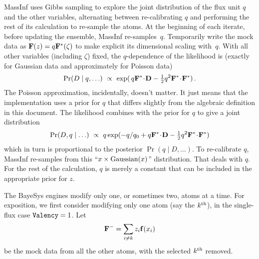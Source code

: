 MassInf uses Gibbs sampling to explore the joint distribution of the flux unit $q$ and the other variables, 
alternating between re-calibrating $q$ and performing the rest of its calculation to re-sample the atoms.
At the beginning of each iterate, before updating the ensemble, MassInf re-samples~$q$.
Temporarily write the mock data as ${\bf F}(z) = q{\bf F}^*(\zeta)$ to make explicit its dimensional scaling with~$q$.
With all other variables (including $\zeta$) fixed, the $q$-dependence of the likelihood is (exactly for Gaussian data and approximately for Poisson data)
$$
    \Pr(D\mid q,\ldots)\ \propto\ \exp(\,q {\bf F}^*\!\cdot\! {\bf D} - \hbox{$1 \over 2$} q^2 {\bf F}^*\!\cdot\! {\bf F}^*)\,.
$$
The Poisson approximation, incidentally, doesn't matter.
It just means that the implementation uses a prior for $q$ that differs slightly from the algebraic definition in this document.
The likelihood combines with the prior for $q$ to give a joint distribution
$$
    \Pr(D,q\mid\ldots)\ \propto\ q \exp( - q/q_0 + q {\bf F}^*\!\cdot\! {\bf D} - \hbox{$1 \over 2$} q^2 {\bf F}^*\!\cdot\! {\bf F}^*)
$$
which in turn is proportional to the posterior $\Pr(q\mid D,\ldots)$.
To re-calibrate $q$, MassInf re-samples from this ``$x\times {\rm Gaussian}(x)$'' distribution.
That deals with $q$.
For the rest of the calculation, $q$ is merely a constant that can be included in the appropriate prior for $z$.

\vfill\eject
{}
\smallskip

The BayeSys engines modify only one, or sometimes two, atoms at a time.
For exposition, we first consider modifying only one atom (say the $k^{\rm th}$), in the single-flux case ${\tt Valency} = 1$.
Let
$$
  {\bf F}^- = \sum_{i \ne k} z_i{\bf f}(x_i)
$$
be the mock data from all the other atoms, with the selected $k^{\rm th}$ removed.

